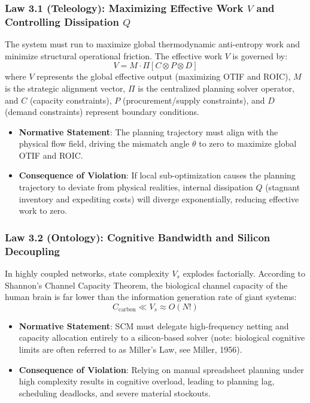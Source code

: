 \documentclass[11pt,a4paper]{article}
\begin{document}
\subsubsection{Law 3.1 (Teleology): Maximizing Effective Work $V$ and Controlling Dissipation $Q$}
The system must run to maximize global thermodynamic anti-entropy work and minimize structural operational friction. The effective work $V$ is governed by:
$$V = M \cdot \Pi [ C \otimes P \otimes D ]$$
where $V$ represents the global effective output (maximizing OTIF and ROIC), $M$ is the strategic alignment vector, $\Pi$ is the centralized planning solver operator, and $C$ (capacity constraints), $P$ (procurement/supply constraints), and $D$ (demand constraints) represent boundary conditions.
\begin{itemize}
    \item \textbf{Normative Statement}: The planning trajectory must align with the physical flow field, driving the mismatch angle $\theta$ to zero to maximize global OTIF and ROIC.
    \item \textbf{Consequence of Violation}: If local sub-optimization causes the planning trajectory to deviate from physical realities, internal dissipation $Q$ (stagnant inventory and expediting costs) will diverge exponentially, reducing effective work to zero.
\end{itemize}

\subsubsection{Law 3.2 (Ontology): Cognitive Bandwidth and Silicon Decoupling}
In highly coupled networks, state complexity $V_s$ explodes factorially. According to Shannon's Channel Capacity Theorem, the biological channel capacity of the human brain is far lower than the information generation rate of giant systems:
$$C_{\text{carbon}} \ll V_s \approx O(N!)$$
\begin{itemize}
    \item \textbf{Normative Statement}: SCM must delegate high-frequency netting and capacity allocation entirely to a silicon-based solver (note: biological cognitive limits are often referred to as Miller's Law, see Miller, 1956).
    \item \textbf{Consequence of Violation}: Relying on manual spreadsheet planning under high complexity results in cognitive overload, leading to planning lag, scheduling deadlocks, and severe material stockouts.
\end{itemize}
\end{document}
